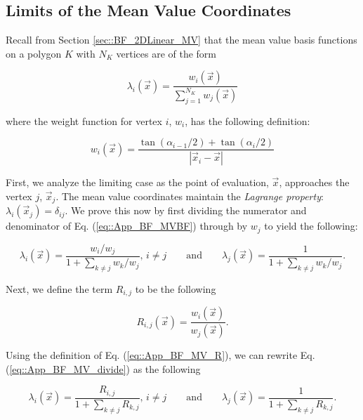 \subsection{Limits of the Mean Value Coordinates}
\label{sec::appendix_BF_Limits_MV}

Recall from Section \ref{sec::BF_2DLinear_MV} that the mean value basis functions on a polygon $K$ with $N_K$ vertices are of the form

\begin{equation}
\label{eq::App_BF_MVBF}
\lambda_i (\vec{x}) = \frac{w_i  (\vec{x}) }{\sum\limits_{j=1}^{N_K} w_j  (\vec{x}) }
\end{equation}

\noindent where the weight function for vertex $i$, $w_i$, has the following definition:

\begin{equation}
\label{eq::App_BF_MV_weights}
w_i (\vec{x})  = \frac{\tan(\alpha_{i-1} / 2) + \tan(\alpha_i / 2)}{|\vec{x}_i - \vec{x}|}
\end{equation}

First, we analyze the limiting case as the point of evaluation, $\vec{x}$, approaches the vertex $j$, $\vec{x}_j$. The mean value coordinates maintain the {\em Lagrange property}: $\lambda_i (\vec{x}_j)=\delta_{ij}$. We prove this now by first dividing the numerator and denominator of Eq. (\ref{eq::App_BF_MVBF}) through by $w_j$ to yield the following:

\begin{equation}
\label{eq::App_BF_MV_divide}
\lambda_i (\vec{x}) = \frac{w_i/w_j}{1+\sum\limits_{k\neq j} w_k/w_j}, \, i \neq j \qquad \text{and} \qquad \lambda_j (\vec{x}) = \frac{1}{1+\sum\limits_{k\neq j} w_k/w_j} .
\end{equation}

\noindent Next, we define the term $R_{i,j}$ to be the following

\begin{equation}
\label{eq::App_BF_MV_R}
R_{i,j}(\vec{x}) = \frac{w_i (\vec{x})}{w_j (\vec{x})} .
\end{equation}

\noindent Using the definition of Eq. (\ref{eq::App_BF_MV_R}), we can rewrite Eq. (\ref{eq::App_BF_MV_divide}) as the following 

\begin{equation}
\label{eq::App_BF_MV_divideR}
\lambda_i (\vec{x}) = \frac{R_{i,j}}{1+\sum\limits_{k\neq j} R_{k,j}}, \, i \neq j \qquad \text{and} \qquad \lambda_j (\vec{x}) = \frac{1}{1+\sum\limits_{k\neq j} R_{k,j}} .
\end{equation}

